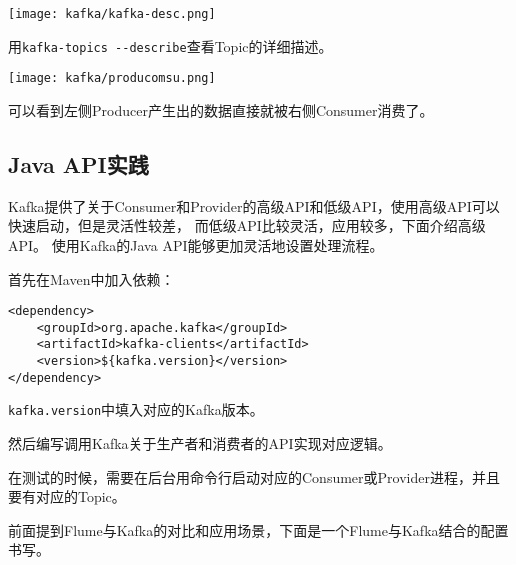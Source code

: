 \begin{center}
    \texttt{[image: kafka/kafka-desc.png]}

    用\lstinline{kafka-topics --describe}查看Topic的详细描述。
\end{center}

\begin{center}
    \texttt{[image: kafka/producomsu.png]}

    可以看到左侧Producer产生出的数据直接就被右侧Consumer消费了。
\end{center}

\subsection{Java API实践}

Kafka提供了关于Consumer和Provider的高级API和低级API，使用高级API可以快速启动，但是灵活性较差，
而低级API比较灵活，应用较多，下面介绍高级API。
使用Kafka的Java API能够更加灵活地设置处理流程。

首先在Maven中加入依赖：
\begin{lstlisting}[style=myxml,title=pom文件中加入下面的依赖]
<dependency>
	<groupId>org.apache.kafka</groupId>
	<artifactId>kafka-clients</artifactId>
	<version>${kafka.version}</version>
</dependency>
\end{lstlisting}

\lstinline{kafka.version}中填入对应的Kafka版本。

然后编写调用Kafka关于生产者和消费者的API实现对应逻辑。





在测试的时候，需要在后台用命令行启动对应的Consumer或Provider进程，并且要有对应的Topic。

前面提到Flume与Kafka的对比和应用场景，下面是一个Flume与Kafka结合的配置书写。


